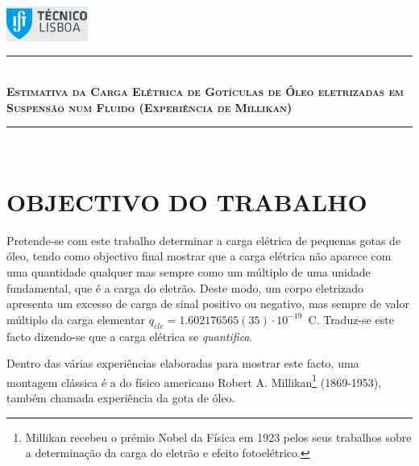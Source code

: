 \documentclass[a4paper,twoside,12pt]{article}      %
\author{Prof. Bernardo B. Carvalho}
\date{ Setembro 2012}
\newcommand{\HRule}{\rule{\linewidth}{0.5mm}}
\begin{document}
 

	\includegraphics[width=0.2\textwidth]{../logo-ist}%

		\HRule \\[0.5cm]
	{ \large \bfseries   \textsc{Estimativa da Carga Elétrica de 
		Gotículas de Óleo eletrizadas em Suspensão num Fluido (Experiência de Millikan)} }\\[0.4cm] %
	\HRule \\%




\section{\sf OBJECTIVO DO TRABALHO}
Pretende-se com este trabalho determinar a carga elétrica de pequenas gotas de óleo, tendo como objectivo final mostrar que a carga elétrica não aparece com uma quantidade qualquer mas sempre como um múltiplo de uma unidade fundamental, que é a carga do eletrão. Deste modo, um corpo eletrizado apresenta um excesso de carga de sinal positivo ou negativo, mas sempre de valor múltiplo da carga elementar $q_{ele}= 1.602176565(35)\cdot 10^{-19}\,$ C.
Traduz-se este facto dizendo-se que a carga elétrica se \emph{quantifica}.

Dentro das várias experiências elaboradas para mostrar este facto, uma montagem clássica é a do físico americano Robert A. Millikan\footnote{Millikan recebeu o prémio Nobel da Física em 1923 pelos seus trabalhos sobre a determinação da carga do eletrão e efeito fotoelétrico.} (1869-1953), também chamada experiência da gota de óleo.
\end{document}
